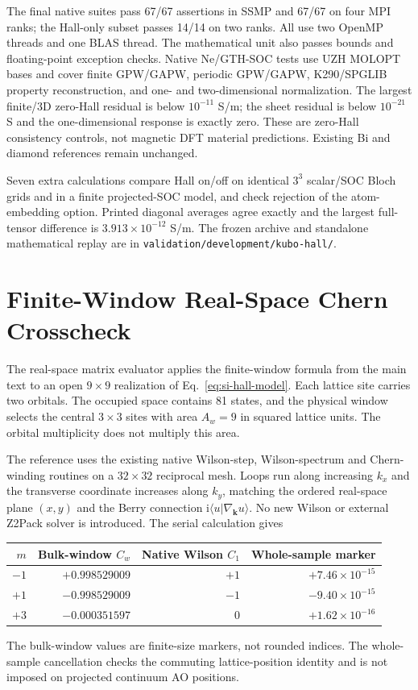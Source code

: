 \documentclass[11pt]{article}
\newcommand{\bk}{\mathbf{k}}
\begin{document}
The final native suites pass 67/67 assertions in SSMP and 67/67
on four MPI ranks; the Hall-only subset passes 14/14 on two ranks.
All use two OpenMP threads and one BLAS thread. The mathematical
unit also passes bounds and floating-point exception checks.
Native Ne/GTH-SOC tests use UZH MOLOPT bases and cover finite
GPW/GAPW, periodic GPW/GAPW, K290/SPGLIB property reconstruction,
and one- and two-dimensional normalization. The largest finite/3D
zero-Hall residual is below $10^{-11}$ S/m; the sheet residual
is below $10^{-21}$ S and the one-dimensional response is exactly
zero. These are zero-Hall consistency controls, not magnetic
DFT material predictions. Existing Bi and diamond references remain
unchanged.

Seven extra calculations compare Hall on/off on identical
$3^3$ scalar/SOC Bloch grids and in a finite projected-SOC model,
and check rejection of the atom-embedding option. Printed
diagonal averages agree exactly and the largest full-tensor
difference is $3.913\times10^{-12}$ S/m.
The frozen archive and standalone mathematical replay are in
\nolinkurl{validation/development/kubo-hall/}.

\section{Finite-Window Real-Space Chern Crosscheck}
\label{sec:si-real-space-chern}
The real-space matrix evaluator applies the finite-window formula
from the main text to an open $9\times9$ realization
of Eq.~\eqref{eq:si-hall-model}. Each lattice site carries two
orbitals. The occupied space contains 81 states, and the physical
window selects the central $3\times3$ sites with area $A_w=9$ in
squared lattice units. The orbital multiplicity does not multiply
this area.

The reference uses the existing native Wilson-step, Wilson-spectrum
and Chern-winding routines on a $32\times32$ reciprocal mesh.
Loops run along increasing $k_x$ and the transverse coordinate
increases along $k_y$, matching the ordered real-space plane $(x,y)$
and the Berry connection $\mathrm{i}\langle u|\nabla_{\bk}u\rangle$.
No new Wilson or external Z2Pack solver is introduced.
The serial calculation gives
\begin{center}
\begin{tabular}{rrrr}
\toprule
$m$ & Bulk-window $C_w$ & Native Wilson $C_1$ & Whole-sample marker\\
\midrule
$-1$ & $+0.998529009$ & $+1$ & $+7.46\times10^{-15}$\\
$+1$ & $-0.998529009$ & $-1$ & $-9.40\times10^{-15}$\\
$+3$ & $-0.000351597$ & $0$ & $+1.62\times10^{-16}$\\
\bottomrule
\end{tabular}
\end{center}
The bulk-window values are finite-size markers, not rounded indices.
The whole-sample cancellation checks the commuting lattice-position
identity and is not imposed on projected continuum AO positions.
\end{document}
